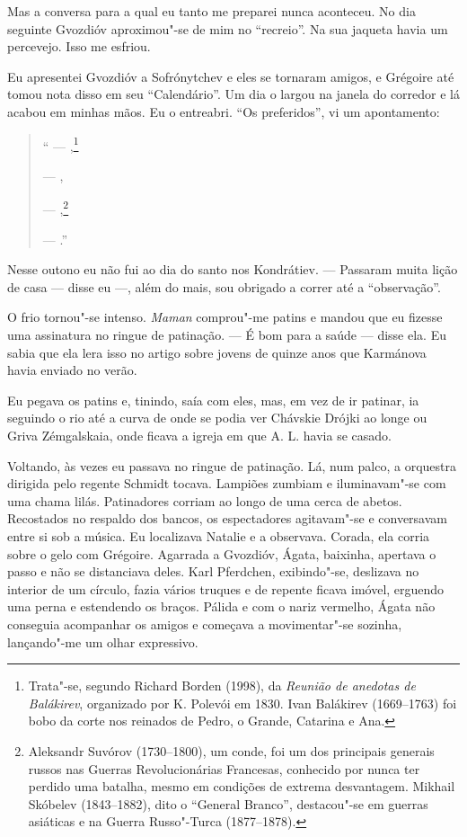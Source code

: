 Mas a conversa para a qual eu tanto me preparei nunca aconteceu. No dia
seguinte Gvozdióv aproximou"-se de mim no ``recreio''. Na sua jaqueta
havia um percevejo. Isso me esfriou.

Eu apresentei Gvozdióv a Sofrónytchev e eles se tornaram amigos, e
Grégoire até tomou nota disso em seu ``Calendário''. Um dia o largou na
janela do corredor e lá acabou em minhas mãos. Eu o entreabri. ``Os
preferidos'', vi um apontamento:

\begin{quotation}
``\scalebox{.8}{LIVRO} --- \emph{\scalebox{.8}{BALÁKIREV}},\footnote{Trata"-se, segundo Richard Borden
  (1998), da \emph{Reunião de anedotas de Balákirev}, organizado por K.
  Polevói em 1830. Ivan Balákirev (1669--1763) foi bobo da corte nos
  reinados de Pedro, o Grande, Catarina \scalebox{.8}{II} e Ana.}

\scalebox{.8}{CANÇÃO} --- \emph{\scalebox{.8}{PELO VOLGA}},

\scalebox{.8}{HERÓI} --- \scalebox{.8}{SUVÓROV E SKÓBELEV},\footnote{Aleksandr Suvórov (1730--1800),
  um conde, foi um dos principais generais russos nas Guerras
  Revolucionárias Francesas, conhecido por nunca ter perdido uma
  batalha, mesmo em condições de extrema desvantagem. Mikhail Skóbelev
  (1843--1882), dito o ``General Branco'', destacou"-se em guerras
  asiáticas e na Guerra Russo"-Turca (1877--1878).}

\scalebox{.8}{AMIGO} --- \scalebox{.8}{N. GVOZDIÓV}.''
\end{quotation}

Nesse outono eu não fui ao dia do santo nos Kondrátiev. --- Passaram
muita lição de casa --- disse eu ---, além do mais, sou obrigado a
correr até a ``observação''.

O frio tornou"-se intenso. \emph{Maman} comprou"-me patins e mandou que eu
fizesse uma assinatura no ringue de patinação. --- É bom para a saúde
--- disse ela. Eu sabia que ela lera isso no artigo sobre jovens de
quinze anos que Karmánova havia enviado no verão.

Eu pegava os patins e, tinindo, saía com eles, mas, em vez de ir
patinar, ia seguindo o rio até a curva de onde se podia ver Chávskie
Drójki ao longe ou Griva Zémgalskaia, onde ficava a igreja em que A. L.
havia se casado.

Voltando, às vezes eu passava no ringue de patinação. Lá, num palco, a
orquestra dirigida pelo regente Schmidt tocava. Lampiões zumbiam e
iluminavam"-se com uma chama lilás. Patinadores corriam ao longo de uma
cerca de abetos. Recostados no respaldo dos bancos, os espectadores
agitavam"-se e conversavam entre si sob a música. Eu localizava Natalie e
a observava. Corada, ela corria sobre o gelo com Grégoire. Agarrada a
Gvozdióv, Ágata, baixinha, apertava o passo e não se distanciava deles.
Karl Pferdchen, exibindo"-se, deslizava no interior de um círculo, fazia
vários truques e de repente ficava imóvel, erguendo uma perna e
estendendo os braços. Pálida e com o nariz vermelho, Ágata não conseguia
acompanhar os amigos e começava a movimentar"-se sozinha, lançando"-me um
olhar expressivo.

